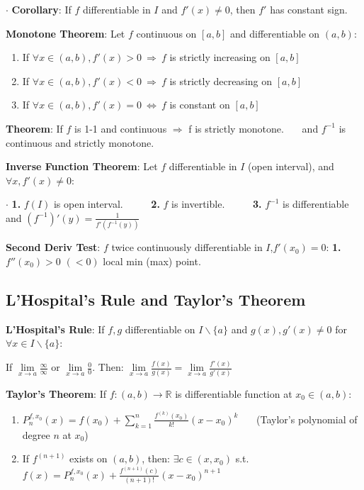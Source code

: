 \documentclass[11pt]{article}
\begin{document}
$\cdot$ \textbf{Corollary}: If $f$ differentiable in $I$ and $f'(x)\ne 0$, then $f'$ has constant sign.

\textbf{Monotone Theorem}: Let $f$ continuous on $[a,b]$ and differentiable on $(a,b)$:
\begin{enumerate}[itemsep=-2pt, topsep=-2pt]
    \item If $\forall x\in(a,b),f'(x)>0 \ \Rightarrow \ f$ is strictly increasing on $[a,b]$
    \item If $\forall x\in(a,b),f'(x)<0 \ \Rightarrow \ f$ is strictly decreasing on $[a,b]$
    \item If $\forall x\in(a,b),f'(x)=0 \ \Leftrightarrow \ f$ is constant on $[a,b]$
\end{enumerate}

\textbf{Theorem}: If $f$ is 1-1 and continuous $\Rightarrow$ f is strictly monotone. \ \ \ and $f^{-1}$ is continuous and strictly monotone.

\textbf{Inverse Function Theorem}: Let $f$ differentiable in $I$ (open interval), and $\forall x,f'(x)\ne 0$:

$\cdot$ \textbf{1.} $f(I)$ is open interval. \ \ \ \ \ \textbf{2.} $f$ is invertible. \ \ \ \ \ \textbf{3.} $f^{-1}$ is differentiable and $(f^{-1})'(y)=\frac{1}{f'(f^{-1}(y))}$

\textbf{Second Deriv Test}: $f$ twice continuously differentiable in $I$,$f'(x_0)=0$: \textbf{1.} $f''(x_0)>0$ $(<0)$ local min (max) point.

\subsection{L'Hospital's Rule and Taylor's Theorem}

\textbf{L'Hospital's Rule}: If $f,g$ differentiable on $I\backslash\{a\}$ and $g(x),g'(x)\ne 0$ for $\forall x\in I\backslash\{a\}$:

If $\lim\limits_{x\to a}\frac{\infty}{\infty}$ or $\lim\limits_{x\to a}\frac{0}{0}$. Then: $\lim\limits_{x\to a}\frac{f(x)}{g(x)}=\lim\limits_{x\to a}\frac{f'(x)}{g'(x)}$

\textbf{Taylor's Theorem}: If $f:(a,b)\to\mathbb{R}$ is differentiable function at $x_0\in(a,b)$:
\begin{enumerate}[itemsep=-2pt, topsep=-2pt]
    \item $P^{f,x_0}_{n}(x)=f(x_0)+\sum\limits_{k=1}^{n}\frac{f^{(k)}(x_0)}{k!}(x-x_0)^k$ \ \ \ (Taylor's polynomial of degree $n$ at $x_0$)
    \item If $f^{(n+1)}$ exists on $(a,b)$, then: $\exists c\in(x,x_0)$ s.t. $f(x)=P^{f,x_0}_{n}(x)+\frac{f^{(n+1)}(c)}{(n+1)!}(x-x_0)^{n+1}$
\end{enumerate}
\end{document}
